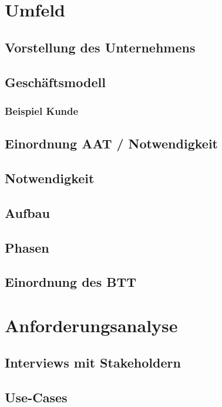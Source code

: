 \documentclass[12pt, titlepage]{article}
\begin{document}


\doublespacing







\newpage
\section{Umfeld}
\subsection{Vorstellung des Unternehmens}
\subsection{Geschäftsmodell}
\subsubsection{Beispiel Kunde}
\subsection{Einordnung AAT / Notwendigkeit}
\subsection{Notwendigkeit}
\subsection{Aufbau}
\subsection{Phasen}
\subsection{Einordnung des BTT}

\newpage


\newpage
\section{Anforderungsanalyse}
\subsection{Interviews mit Stakeholdern}
\subsection{Use-Cases}
\end{document}
